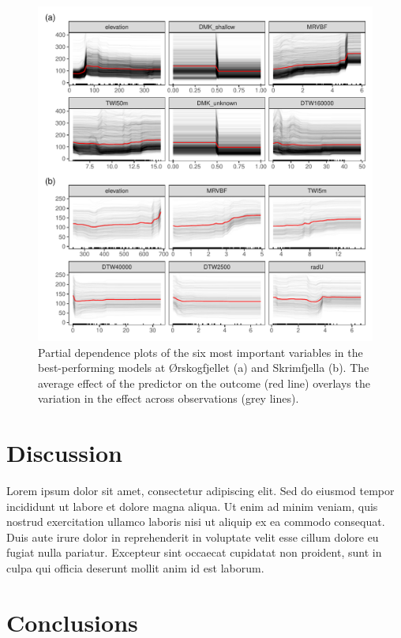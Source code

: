 \documentclass[soil, manuscript]{copernicus}
\begin{document}
\begin{figure}
\centering
\includegraphics{figures/partial_dependence.pdf}
\caption{\label{fig:pdps}Partial dependence plots of the six most important variables in the best-performing models at Ørskogfjellet (a) and Skrimfjella (b). The average effect of the predictor on the outcome (red line) overlays the variation in the effect across observations (grey lines).}
\end{figure}

\section{Discussion}

Lorem ipsum dolor sit amet, consectetur adipiscing elit.
Sed do eiusmod tempor incididunt ut labore et dolore magna aliqua.
Ut enim ad minim veniam, quis nostrud exercitation ullamco laboris nisi ut aliquip ex ea commodo consequat.
Duis aute irure dolor in reprehenderit in voluptate velit esse cillum dolore eu fugiat nulla pariatur.
Excepteur sint occaecat cupidatat non proident,
sunt in culpa qui officia deserunt mollit anim id est laborum.

\section{Conclusions}
\end{document}
